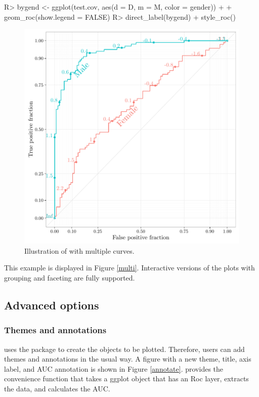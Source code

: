 \documentclass[codesnippet]{jss}
\begin{document}
\begin{Schunk}
\begin{Sinput}
R> bygend <- ggplot(test.cov, aes(d = D, m = M, color = gender)) + 
+   geom_roc(show.legend = FALSE)
R> direct_label(bygend) + style_roc()
\end{Sinput}
\begin{figure}
\includegraphics{figure/covplot-1} \caption{Illustration of  with multiple curves. \label{multi}}\label{fig:covplot}
\end{figure}
\end{Schunk}

This example is displayed in Figure \ref{multi}. Interactive versions of
the plots with grouping and faceting are fully supported.

\subsection{Advanced options}\label{advanced-options}

\subsubsection{Themes and annotations}\label{themes-and-annotations}

 uses the  package to create the objects to be
plotted. Therefore, users can add themes and annotations in the usual
 way. A figure with a new theme, title, axis label, and AUC
annotation is shown in Figure \ref{annotate}.  provides the
convenience function  that takes a ggplot object that has
an Roc layer, extracts the data, and calculates the AUC.
\end{document}
